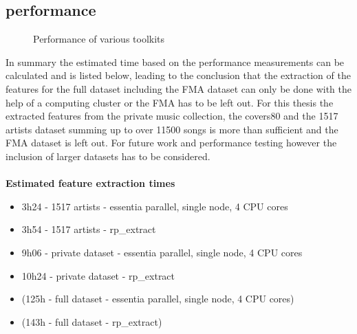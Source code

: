 \subsection{performance}
\begin{figure}[htbp]
	\centering
	\caption{Performance of various toolkits}
	\label{perfex}
\end{figure}
In summary the estimated time based on the performance measurements can be calculated and is listed below, leading to the conclusion that the extraction of the features for the full dataset including the FMA dataset can only be done with the help of a computing cluster or the FMA has to be left out. For this thesis the extracted features from the private music collection, the covers80 and the 1517 artists dataset summing up to over 11500 songs is more than sufficient and the FMA dataset is left out. For future work and performance testing however the inclusion of larger datasets has to be considered. 
\ \\
\ \\
\textbf{Estimated feature extraction times}
\begin{itemize}
	\item 3h24 - 1517 artists - essentia parallel, single node, 4 CPU cores
	\item 3h54 - 1517 artists - rp\_extract
	\item 9h06 - private dataset - essentia parallel, single node, 4 CPU cores
	\item 10h24 - private dataset - rp\_extract
	\item (125h - full dataset - essentia parallel, single node, 4 CPU cores)
	\item (143h - full dataset - rp\_extract)
\end{itemize}
